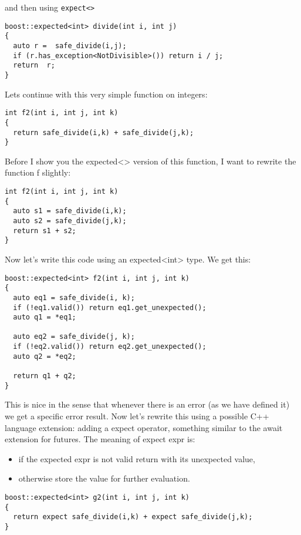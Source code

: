 \documentclass[a4paper,10pt]{article}
\newcommand{\cpp}[1]{\lstinline{#1}}
\begin{document}
and then using \cpp{expect<>}

\begin{lstlisting}
boost::expected<int> divide(int i, int j)
{
  auto r =  safe_divide(i,j);
  if (r.has_exception<NotDivisible>()) return i / j;
  return  r;
}
\end{lstlisting}


Lets continue with this very simple function on integers:

\begin{lstlisting}
int f2(int i, int j, int k)
{
  return safe_divide(i,k) + safe_divide(j,k);
}
\end{lstlisting}

Before I show you the expected<> version of this function, I want to rewrite the function f slightly:

\begin{lstlisting}
int f2(int i, int j, int k)
{
  auto s1 = safe_divide(i,k);
  auto s2 = safe_divide(j,k);
  return s1 + s2;
}
\end{lstlisting}


Now let's write this code using an expected<int> type. We get this:

\begin{lstlisting}
boost::expected<int> f2(int i, int j, int k)
{
  auto eq1 = safe_divide(i, k);
  if (!eq1.valid()) return eq1.get_unexpected();
  auto q1 = *eq1;

  auto eq2 = safe_divide(j, k);
  if (!eq2.valid()) return eq2.get_unexpected();
  auto q2 = *eq2;

  return q1 + q2;
}
\end{lstlisting}

This is nice in the sense that whenever there is an error (as we have defined it) we get a specific error result. Now let's rewrite this using a possible C++ language extension:
adding a expect operator, something similar to the await extension for futures.  The meaning of expect expr is:

\begin{itemize}
 \item if the expected expr is not valid return with its unexpected value,
 \item otherwise store the value for further evaluation.
\end{itemize}

\begin{lstlisting}
boost::expected<int> g2(int i, int j, int k)
{
  return expect safe_divide(i,k) + expect safe_divide(j,k);
}
\end{lstlisting}
\end{document}
